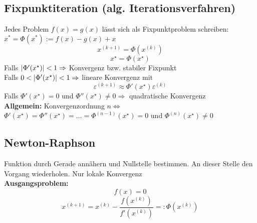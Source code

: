 \documentclass[german]{latex4ei/latex4ei_sheet}
\begin{document}
\begin{sectionbox}
\subsection{Fixpunktiteration (alg. Iterationsverfahren)}
Jedes Problem $f(x) = g(x)$ lässt sich als Fixpunktproblem schreiben:\\
$x^* = Φ(x^*) := f(x) - g(x) + x$
\begin{equation*}
	x^{(k + 1)} = \Phi(x^{(k)})
\end{equation*}
\begin{equation*}
	x^\star = \Phi(x^\star)
\end{equation*}
Falls $\left\vert\Phi'(x^\star)\right\vert < 1 \Rightarrow$ Konvergenz bzw. stabiler Fixpunkt \\
Falls $0 < \left\vert\Phi'(x^\star)\right\vert < 1 \Rightarrow$ lineare Konvergenz mit
\begin{equation*}
	\varepsilon^{(k + 1)} \approx \Phi'(x^\star) \varepsilon^{(k)}
\end{equation*}
Falls $\Phi'(x^\star) = 0$ und $\Phi''(x^\star) \ne 0 \Rightarrow$ quadratische Konvergenz \\
\textbf{Allgemein:} Konvergenzordnung $n \Leftrightarrow$\\ $\Phi'(x^\star) = \Phi''(x^\star) = \ldots = \Phi^{(n - 1)}(x^\star) = 0$ und $\Phi^{(n)}(x^\star) \ne 0$
\end{sectionbox}

\begin{sectionbox}
\subsection{Newton-Raphson}
	Funktion durch Gerade annähern und Nullstelle bestimmen. An dieser Stelle den Vorgang wiederholen. Nur lokale Konvergenz\\
\textbf{Ausgangsproblem:}
\begin{equation*}
	f(x) = 0
\end{equation*}
\begin{equation*}
	x^{(k + 1)} = x^{(k)} - \frac{f(x^{(k)})}{f'(x^{(k)})}  =: Φ\left(x^{(k)}\right)
\end{equation*}
\end{sectionbox}
\end{document}
